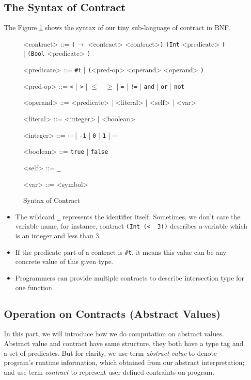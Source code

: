 \documentclass[paper=a4, fontsize=11pt]{scrartcl} %
\numberwithin{equation}{section} %
\numberwithin{figure}{section} %
\numberwithin{table}{section} %
\begin{document}
\subsection{The Syntax of Contract}
The Figure \ref{figc} shows the syntax of our tiny sub-language of contract in BNF.
\begin{figure}[h!]
\setlength{\grammarparsep}{7pt plus 1pt minus 1pt} %
\setlength{\grammarindent}{8em} %
\begin{grammar}
<contract> ::= \texttt{($\rightarrow$} <contract> <contract>\texttt{)}
\alt \texttt{(Int} <predicate> \texttt{)} | \texttt{(Bool} <predicate> \texttt{)}

<predicate> ::= \texttt{\#t} | \texttt{(}<pred-op> <operand> <operand> \texttt{)}

<pred-op> ::= \texttt{\textless} | \texttt{\textgreater} | \texttt{$\leq$} | \texttt{$\geq$} | \texttt{=} | \texttt{!=} | \texttt{and} | \texttt{or} | \texttt{not}

<operand> ::= <predicate> | <literal> | <self> | <var>

<literal> ::= <integer> | <boolean>

<integer> ::= $\cdots$ | \texttt{-1} | \texttt{0} | \texttt{1} | $\cdots$

<boolean> ::= \texttt{true} | \texttt{false}

<self> ::= \texttt{_}

<var> ::= <symbol>
\end{grammar}
\caption{Syntax of Contract}
\label{figc}
\end{figure}

\begin{itemize}
\item The wildcard \texttt{_} represents the identifier itself. Sometimes, we don't care the variable name, for instance, contract \texttt{(Int\ (\textless\ \underscore\ 3))} describes a variable which is an integer and less than 3.

\item If the predicate part of a contract is \texttt{\#t}, it means this value can be any concrete value of this given type.

\item Programmers can provide multiple contracts to describe intersection type for one function.
\end{itemize}

\subsection{Operation on Contracts (Abstract Values)}
In this part, we will introduce how we do computation on abstract values. Abstract value and contract have same structure, they both have a type tag and a set of predicates. But for clarity, we use term \textit{abstract value} to denote program's runtime information, which obtained from our abstract interpretation; and use term \textit{contract} to represent user-defined contraints on program. \\
\end{document}

